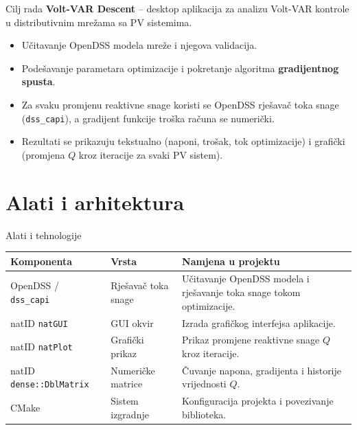 \documentclass[10pt,aspectratio=169]{beamer}
\begin{document}
\begin{frame}{Cilj rada}
  \textbf{Volt-VAR Descent} -- desktop aplikacija za analizu Volt-VAR kontrole u distributivnim mrežama sa PV sistemima.
  \begin{itemize}
    \item Učitavanje OpenDSS modela mreže i njegova validacija.
    \item Podešavanje parametara optimizacije i pokretanje algoritma \textbf{gradijentnog spusta}.
    \item Za svaku promjenu reaktivne snage koristi se OpenDSS rješavač toka snage (\texttt{dss\_capi}), a gradijent funkcije troška računa se numerički.
    \item Rezultati se prikazuju tekstualno (naponi, trošak, tok optimizacije) i grafički (promjena $Q$ kroz iteracije za svaki PV sistem).
  \end{itemize}
\end{frame}

\section{Alati i arhitektura}

\begin{frame}{Alati i tehnologije}
  \centering
  \small
  \begin{tabular}{L{2.6cm}L{2.4cm}L{7.5cm}}
    \toprule
    \textbf{Komponenta} & \textbf{Vrsta} & \textbf{Namjena u projektu} \\
    \midrule
    OpenDSS / \texttt{dss\_capi} & Rješavač toka snage & Učitavanje OpenDSS modela i rješavanje toka snage tokom optimizacije. \\
    natID \texttt{natGUI} & GUI okvir & Izrada grafičkog interfejsa aplikacije. \\
    natID \texttt{natPlot} & Grafički prikaz & Prikaz promjene reaktivne snage $Q$ kroz iteracije. \\
    natID \texttt{dense::DblMatrix} & Numeričke matrice & Čuvanje napona, gradijenta i historije vrijednosti $Q$. \\
    CMake & Sistem izgradnje & Konfiguracija projekta i povezivanje biblioteka. \\
    \bottomrule
  \end{tabular}
\end{frame}
\end{document}
